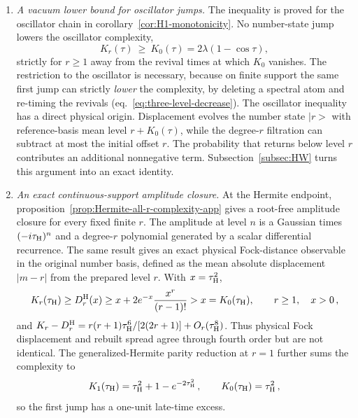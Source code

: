 \documentclass[a4paper,11pt]{article}
\def\ket#1{|#1>}%
\def\ii{i}%
\def\ee{e}%
\theoremstyle{definition}
\theoremstyle{remark}
\newcommand{\ket}[1]{|#1\rangle}
\newcommand{\ii}{\mathrm i}
\newcommand{\ee}{\mathrm e}
\begin{document}
\begin{enumerate}[label=\emph{(\roman*)},leftmargin=2.2em,itemsep=4pt,topsep=4pt,parsep=0pt]
\item \emph{A vacuum lower bound for oscillator jumps.}
The inequality is proved for the
oscillator chain in corollary~\ref{cor:H1-monotonicity}. No number-state jump lowers the oscillator complexity,
\begin{equation}
   K_r(\tau)\ \ge\ K_0(\tau)=2\lambda(1-\cos\tau),
   \label{eq:intro-vacuum-bound}
\end{equation}
strictly for $r\ge1$ away from the revival times at which $K_0$ vanishes. The restriction to the
oscillator is necessary, because on finite support the same first jump can strictly \emph{lower}
the complexity, by deleting a spectral atom and re-timing the revivals
(eq.~\eqref{eq:three-level-decrease}).
The oscillator inequality has a direct physical origin.  Displacement evolves the number
state $\ket r$ with reference-basis mean level $r+K_0(\tau)$, while the degree-$r$ filtration can
subtract at most the initial offset $r$.  The probability that returns below level $r$
contributes an
additional nonnegative term.  Subsection~\ref{subsec:HW} turns this argument into an exact identity.

\item \emph{An exact
continuous-support amplitude closure.}
At the Hermite endpoint, proposition~\ref{prop:Hermite-all-r-complexity-app} gives a root-free
amplitude closure for every fixed finite $r$. The amplitude at level $n$ is a Gaussian times
$(-\ii\tau_{\rm H})^n$ and a degree-$r$ polynomial generated by a scalar differential
recurrence.
The same result gives an exact physical Fock-distance observable in the original number basis, defined as the mean absolute displacement $|m-r|$ from the prepared level $r$.  With $x=\tau_{\rm H}^2$,
\begin{equation}
   K_r(\tau_{\rm H})\ge D_r^{\rm H}(x)
   \ge x+2\ee^{-x}\frac{x^r}{(r-1)!}
   >x=K_0(\tau_{\rm H}),
   \qquad r\ge1,\quad x>0\,,
   \label{eq:intro-Hermite-radial-bound}
\end{equation}
and
$K_r-D_r^{\rm H}=r(r+1)\tau_{\rm H}^6/[2(2r+1)]
+O_r(\tau_{\rm H}^8)$.  Thus physical Fock displacement and rebuilt spread agree through fourth
order but are not identical.  The generalized-Hermite parity reduction at $r=1$ further sums the
complexity to
\begin{equation}
   K_1(\tau_{\rm H})=\tau_{\rm H}^2+1-\ee^{-2\tau_{\rm H}^2}\,,
   \qquad
   K_0(\tau_{\rm H})=\tau_{\rm H}^2 \,,
   \label{eq:intro-hermite-endpoint}
\end{equation}
so the first jump has a one-unit late-time excess.


\end{enumerate}
\end{document}
